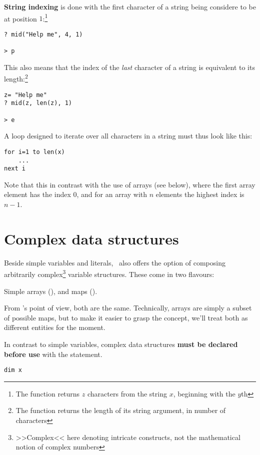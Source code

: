 \textbf{String indexing}  is done with the first
character of a string being considere to be at position $1$:\footnote{The
function  returns $z$ characters from the string $x$,
beginning with the $y$th}

\begin{lstlisting}
? mid("Help me", 4, 1)

> p
\end{lstlisting}

This also means that the index of the \emph{last} character of a string
is equivalent to its length:\footnote{The function  returns
the length of its string argument, in number of characters}

\begin{lstlisting}
z= "Help me"
? mid(z, len(z), 1)

> e
\end{lstlisting}

A loop designed to iterate over all characters in a string  must thus
look like this:

\begin{lstlisting}
for i=1 to len(x)
	...
next i
\end{lstlisting}

Note that this in contrast with the use of arrays (see below), where the first
array element has the index $0$, and for an array with $n$ elements the
highest index is $n-1$.

\section{Complex data structures}

Beside simple variables and literals, \SB\ also offers the option of
composing arbitrarily complex\footnote{>>Complex<< here denoting
intricate constructs, not the mathematical notion of complex numbers}
variable structures. These come in two flavours: 

Simple arrays (), and maps ().

From \SB's point of view, both are the same. Technically, arrays are
simply a subset of possible maps, but to make it easier to grasp the
concept, we'll treat both as different entities for the moment.

In contrast to simple variables, complex data structures \textbf{must be
declared before use} with the  statement.

\begin{lstlisting}
dim x
\end{lstlisting}

